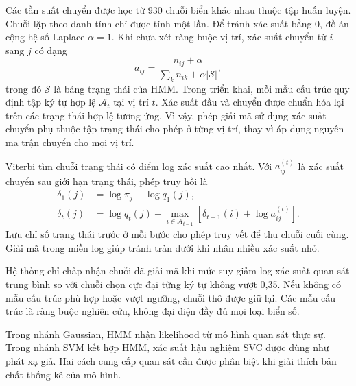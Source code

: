 Các tần suất chuyển được học từ 930 chuỗi biển khác nhau thuộc tập huấn luyện. Chuỗi lặp theo danh tính chỉ được tính một lần. Để tránh xác suất bằng 0, đồ án cộng hệ số Laplace $\alpha=1$. Khi chưa xét ràng buộc vị trí, xác suất chuyển từ $i$ sang $j$ có dạng
\begin{equation}
a_{ij}=\frac{n_{ij}+\alpha}{\sum_k n_{ik}+\alpha |\mathcal{S}|},
\end{equation}
trong đó $\mathcal{S}$ là bảng trạng thái của HMM. Trong triển khai, mỗi mẫu cấu trúc quy định tập ký tự hợp lệ $\mathcal{A}_t$ tại vị trí $t$. Xác suất đầu và chuyển được chuẩn hóa lại trên các trạng thái hợp lệ tương ứng. Vì vậy, phép giải mã sử dụng xác suất chuyển phụ thuộc tập trạng thái cho phép ở từng vị trí, thay vì áp dụng nguyên ma trận chuyển cho mọi vị trí.

Viterbi tìm chuỗi trạng thái có điểm log xác suất cao nhất. Với $a_{ij}^{(t)}$ là xác suất chuyển sau giới hạn trạng thái, phép truy hồi là
\begin{align}
\delta_1(j)&=\log\pi_j+\log q_1(j),\\
\delta_t(j)&=\log q_t(j)+\max_{i\in\mathcal{A}_{t-1}}
\left[\delta_{t-1}(i)+\log a_{ij}^{(t)}\right].
\end{align}
Lưu chỉ số trạng thái trước ở mỗi bước cho phép truy vết để thu chuỗi cuối cùng. Giải mã trong miền log giúp tránh tràn dưới khi nhân nhiều xác suất nhỏ.

Hệ thống chỉ chấp nhận chuỗi đã giải mã khi mức suy giảm log xác suất quan sát trung bình so với chuỗi chọn cực đại từng ký tự không vượt 0,35. Nếu không có mẫu cấu trúc phù hợp hoặc vượt ngưỡng, chuỗi thô được giữ lại. Các mẫu cấu trúc là ràng buộc nghiên cứu, không đại diện đầy đủ mọi loại biển số.

Trong nhánh Gaussian, HMM nhận likelihood từ mô hình quan sát thực sự. Trong nhánh SVM kết hợp HMM, xác suất hậu nghiệm SVC được dùng như phát xạ giả. Hai cách cung cấp quan sát cần được phân biệt khi giải thích bản chất thống kê của mô hình.
